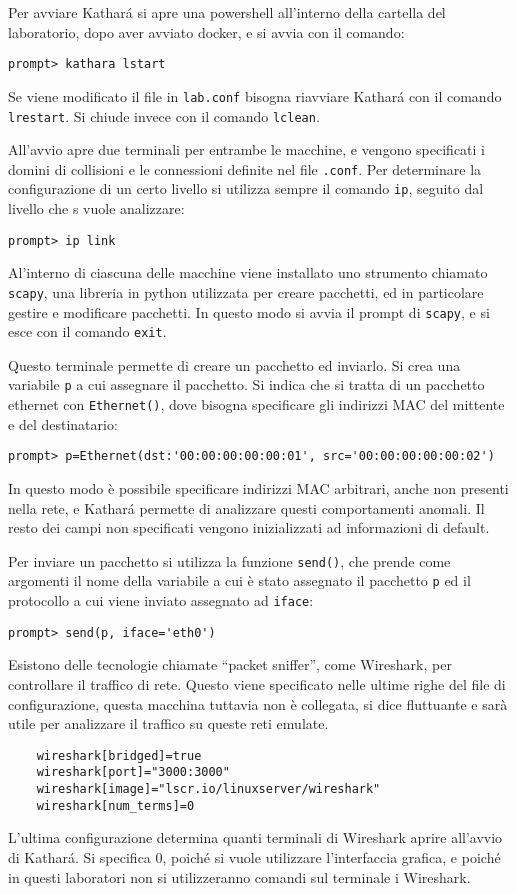 \documentclass{article}
\numberwithin{equation}{subsection}
\begin{document}
Per avviare Kathar\'{a} si apre una powershell all'interno della cartella del laboratorio, dopo aver avviato docker, e si avvia con il comando:
\begin{verbatim}
prompt> kathara lstart
\end{verbatim}

Se viene modificato il file in \verb|lab.conf| bisogna riavviare Kathará con il comando \verb|lrestart|. Si chiude invece con il comando \verb|lclean|. 

All'avvio apre due terminali per entrambe le macchine, e vengono specificati i domini di collisioni e le connessioni definite nel file \verb|.conf|. 
Per determinare la configurazione di un certo livello si utilizza sempre il comando \verb|ip|, seguito dal livello che s vuole analizzare:
\begin{verbatim}
prompt> ip link
\end{verbatim}

Al'interno di ciascuna delle macchine viene installato uno strumento chiamato \verb|scapy|, una libreria in python utilizzata per creare pacchetti, ed in particolare 
gestire e modificare pacchetti. In questo modo si avvia il prompt di \verb|scapy|, e si esce con il comando \verb|exit|. 

Questo terminale permette di creare un pacchetto ed inviarlo. Si crea una variabile \verb|p| a cui assegnare il pacchetto. Si indica che si tratta di un 
pacchetto ethernet con \verb|Ethernet()|, dove bisogna specificare gli indirizzi MAC del mittente e del destinatario:
\begin{verbatim}
prompt> p=Ethernet(dst:'00:00:00:00:00:01', src='00:00:00:00:00:02')
\end{verbatim} 
In questo modo è possibile specificare indirizzi MAC arbitrari, anche non presenti nella rete, e Kathar\'{a} permette di analizzare questi comportamenti anomali. 
Il resto dei campi non specificati vengono inizializzati ad informazioni di default. 

Per inviare un pacchetto si utilizza la funzione \verb|send()|, che prende come argomenti il nome della variabile a cui è stato assegnato il pacchetto \verb|p| ed 
il protocollo a cui viene inviato assegnato ad \verb|iface|:
\begin{verbatim}
prompt> send(p, iface='eth0')
\end{verbatim}

Esistono delle tecnologie chiamate ``packet sniffer'', come Wireshark, per controllare il traffico di rete. Questo viene specificato nelle ultime righe del 
file di configurazione, questa macchina tuttavia non è collegata, si dice fluttuante e sarà utile per analizzare il traffico su queste reti emulate. 
\begin{verbatim}
	wireshark[bridged]=true
	wireshark[port]="3000:3000"
	wireshark[image]="lscr.io/linuxserver/wireshark"
	wireshark[num_terms]=0
\end{verbatim}
L'ultima configurazione determina quanti terminali di Wireshark aprire all'avvio di Kathar\'{a}. Si specifica 0, poiché si vuole utilizzare l'interfaccia grafica, e 
poiché in questi laboratori non si utilizzeranno comandi sul terminale i Wireshark. 
\end{document}

